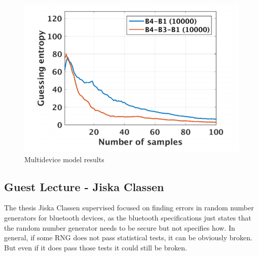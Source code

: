 \begin{figure}
    \centering
    \includegraphics[scale=0.5]{images/chapter8/multidevice.PNG}
    \caption{Multidevice model results}
    \label{fig:multidevice}
\end{figure}
\subsection{Guest Lecture - Jiska Classen}
The thesis Jiska Classen supervised focused on finding errors in random number generators for bluetooth devices, as the bluetooth specifications just states that the random number generator needs to be secure but not specifies how.
In general, if some RNG does not pass statistical tests, it can be obviously broken.
But even if it does pass those tests it could still be broken.\\


